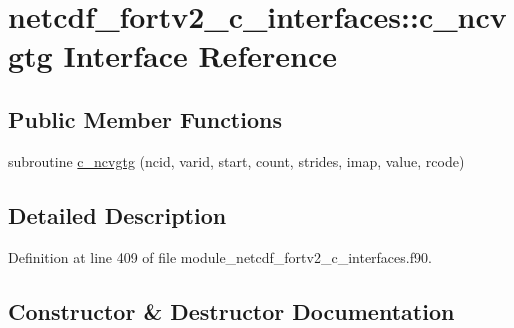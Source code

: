 \hypertarget{interfacenetcdf__fortv2__c__interfaces_1_1c__ncvgtg}{}\section{netcdf\+\_\+fortv2\+\_\+c\+\_\+interfaces\+:\+:c\+\_\+ncvgtg Interface Reference}
\label{interfacenetcdf__fortv2__c__interfaces_1_1c__ncvgtg}
\subsection*{Public Member Functions}
\begin{DoxyCompactItemize}
\item 
subroutine \hyperlink{interfacenetcdf__fortv2__c__interfaces_1_1c__ncvgtg_a8893cecb4eef2fc91a47bc8eba5b7958}{c\+\_\+ncvgtg} (ncid, varid, start, count, strides, imap, value, rcode)
\end{DoxyCompactItemize}


\subsection{Detailed Description}


Definition at line 409 of file module\+\_\+netcdf\+\_\+fortv2\+\_\+c\+\_\+interfaces.\+f90.



\subsection{Constructor \& Destructor Documentation}
\mbox{\label{interfacenetcdf__fortv2__c__interfaces_1_1c__ncvgtg_a8893cecb4eef2fc91a47bc8eba5b7958}} 
